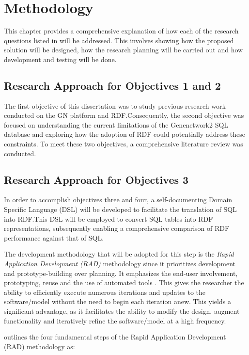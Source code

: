 \chapter{Methodology}

This chapter provides a comprehensive explanation of how each of the research questions listed in  will be addressed.  This involves showing how the proposed solution will be designed, how the research planning will be carried out and how development and testing will be done.

\section{Research Approach for Objectives 1 and 2}

The first objective of this dissertation was to study previous research work conducted on the GN platform and RDF.\@  Consequently, the second objective was focused on understanding the current limitations of the Genenetwork2 SQL database and exploring how the adoption of RDF could potentially address these constraints.  To meet these two objectives, a comprehensive literature review was conducted.

\section{Research Approach for Objectives 3}

In order to accomplish objectives three and four, a self-documenting Domain Specific Language (DSL) will be developed to facilitate the translation of SQL into RDF.\@  This DSL will be employed to convert SQL tables into RDF representations, subsequently enabling a comprehensive comparison of RDF performance against that of SQL\@.

The development methodology that will be adopted for this step is the \textit{Rapid Application Development (RAD)} methodology since it prioritizes development and prototype-building over planning.  It emphasizes the end-user involvement, prototyping, reuse and the use of automated tools \citep*{van2008software}.  This gives the researcher the ability to efficiently execute numerous iterations and updates to the software/model without the need to begin each iteration anew.  This yields a significant advantage, as it facilitates the ability to modify the design, augment functionality and iteratively refine the software/model at a high frequency.

\citet*{van2008software} outlines the four fundamental steps of the Rapid Application Development (RAD) methodology as:

